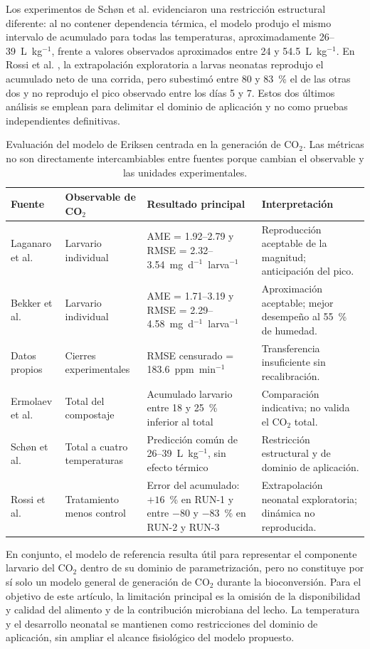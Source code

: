 Los experimentos de Schøn et al. \cite{schonEffectTemperatureGrowth2024} evidenciaron una restricción estructural diferente: al no contener dependencia térmica, el modelo produjo el mismo intervalo de acumulado para todas las temperaturas, aproximadamente 26--39~L~kg$^{-1}$, frente a valores observados aproximados entre 24 y 54.5~L~kg$^{-1}$. En Rossi et al. \cite{rossiEstimatingDynamicsGreenhouse2024a}, la extrapolación exploratoria a larvas neonatas reprodujo el acumulado neto de una corrida, pero subestimó entre 80 y 83~\% el de las otras dos y no reprodujo el pico observado entre los días 5 y 7. Estos dos últimos análisis se emplean para delimitar el dominio de aplicación y no como pruebas independientes definitivas.

\begin{table}[htbp]
\centering
\caption{Evaluación del modelo de Eriksen centrada en la generación de CO$_2$. Las métricas no son directamente intercambiables entre fuentes porque cambian el observable y las unidades experimentales.}
\label{tab:evaluacion_eriksen_co2}
\small
\setlength{\tabcolsep}{3pt}
\begin{tabular}{p{2.0cm} p{3.0cm} p{4.1cm} p{4.5cm}}
\hline
Fuente & Observable de CO$_2$ & Resultado principal & Interpretación \\
\hline
Laganaro et al. & Larvario individual &
AME = 1.92--2.79 y RMSE = 2.32--3.54~mg~d$^{-1}$~larva$^{-1}$ &
Reproducción aceptable de la magnitud; anticipación del pico. \\
Bekker et al. & Larvario individual &
AME = 1.71--3.19 y RMSE = 2.29--4.58~mg~d$^{-1}$~larva$^{-1}$ &
Aproximación aceptable; mejor desempeño al 55~\% de humedad. \\
Datos propios & Cierres experimentales &
RMSE censurado = 183.6~ppm~min$^{-1}$ &
Transferencia insuficiente sin recalibración. \\
Ermolaev et al. & Total del compostaje &
Acumulado larvario entre 18 y 25~\% inferior al total &
Comparación indicativa; no valida el CO$_2$ total. \\
Schøn et al. & Total a cuatro temperaturas &
Predicción común de 26--39~L~kg$^{-1}$, sin efecto térmico &
Restricción estructural y de dominio de aplicación. \\
Rossi et al. & Tratamiento menos control &
Error del acumulado: $+16$~\% en RUN-1 y entre $-80$ y $-83$~\% en RUN-2 y RUN-3 &
Extrapolación neonatal exploratoria; dinámica no reproducida. \\
\hline
\end{tabular}
\end{table}

En conjunto, el modelo de referencia resulta útil para representar el componente larvario del CO$_2$ dentro de su dominio de parametrización, pero no constituye por sí solo un modelo general de generación de CO$_2$ durante la bioconversión. Para el objetivo de este artículo, la limitación principal es la omisión de la disponibilidad y calidad del alimento y de la contribución microbiana del lecho. La temperatura y el desarrollo neonatal se mantienen como restricciones del dominio de aplicación, sin ampliar el alcance fisiológico del modelo propuesto.
